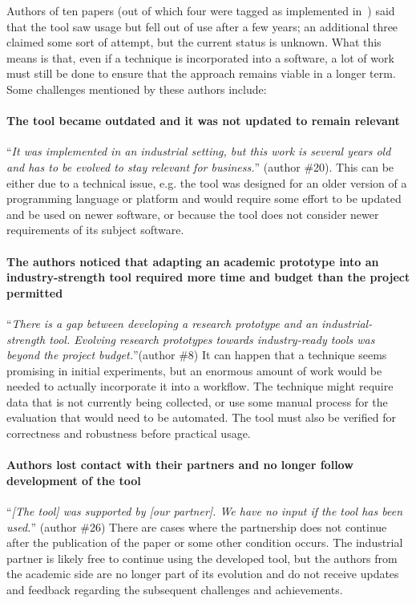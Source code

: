 Authors of ten papers (out of which four were tagged as implemented in~) said that the tool saw usage but fell out of use after a few years; an additional three claimed some sort of attempt, but the current status is unknown.
What this means is that, even if a technique is incorporated into a software, a lot of work must still be done to ensure that the approach remains viable in a longer term.
Some challenges mentioned by these authors include:

\paragraph{The tool became outdated and it was not updated to remain relevant}
``\textit{It was implemented in an industrial setting, but this work is several years old and has to be evolved to stay relevant for business.}'' (author \#20).
This can be either due to a technical issue, e.g. the tool was designed for an older version of a programming language or platform and would require some effort to be updated and be used on newer software, or because the tool does not consider newer requirements of its subject software.

\paragraph{The authors noticed that adapting an academic prototype into an industry-strength tool required more time and budget than the project permitted}
``\textit{There is a gap between developing a research prototype and an industrial-strength tool. Evolving research prototypes towards industry-ready tools was beyond the project budget.}''(author \#8)
It can happen that a technique seems promising in initial experiments, but an enormous amount of work would be needed to actually incorporate it into a workflow.
The technique might require data that is not currently being collected, or use some manual process for the evaluation that would need to be automated.
The tool must also be verified for correctness and robustness before practical usage.

\paragraph{Authors lost contact with their partners and no longer follow development of the tool}
``\textit{[The tool] was supported by [our partner]. We have no input if the tool has been used.}'' (author \#26)
There are cases where the partnership does not continue after the publication of the paper or some other condition occurs.
The industrial partner is likely free to continue using the developed tool, but the authors from the academic side are no longer part of its evolution and do not receive updates and feedback regarding the subsequent challenges and achievements.

